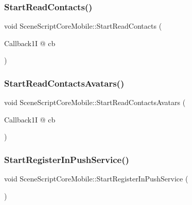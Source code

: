 \subsubsection{\texorpdfstring{Start\+Read\+Contacts()}{StartReadContacts()}}
{\footnotesize\ttfamily void Scene\+Script\+Core\+Mobile\+::\+Start\+Read\+Contacts (\begin{DoxyParamCaption}\item[{Callback1I @}]{cb }\end{DoxyParamCaption})}

\hypertarget{class_scene_script_core_mobile_a98d84f8e5a4aaa629fbb2496ba697551}{}\label{class_scene_script_core_mobile_a98d84f8e5a4aaa629fbb2496ba697551} 
\subsubsection{\texorpdfstring{Start\+Read\+Contacts\+Avatars()}{StartReadContactsAvatars()}}
{\footnotesize\ttfamily void Scene\+Script\+Core\+Mobile\+::\+Start\+Read\+Contacts\+Avatars (\begin{DoxyParamCaption}\item[{Callback1I @}]{cb }\end{DoxyParamCaption})}

\hypertarget{class_scene_script_core_mobile_a10b274acb407ecc9873e31d85bd500a2}{}\label{class_scene_script_core_mobile_a10b274acb407ecc9873e31d85bd500a2} 
\subsubsection{\texorpdfstring{Start\+Register\+In\+Push\+Service()}{StartRegisterInPushService()}}
{\footnotesize\ttfamily void Scene\+Script\+Core\+Mobile\+::\+Start\+Register\+In\+Push\+Service (\begin{DoxyParamCaption}{ }\end{DoxyParamCaption})}

\hypertarget{class_scene_script_core_mobile_a50227898d842f9fe68574d9512b4f3ae}{}\label{class_scene_script_core_mobile_a50227898d842f9fe68574d9512b4f3ae} 
